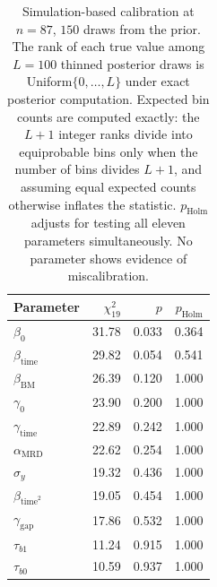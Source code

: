\begin{table}[!htbp]
\centering
\caption{Simulation-based calibration at $n=87$, $150$ draws from the prior. The rank of each true value among $L=100$ thinned posterior draws is Uniform$\{0,\dots,L\}$ under exact posterior computation. Expected bin counts are computed exactly: the $L+1$ integer ranks divide into equiprobable bins only when the number of bins divides $L+1$, and assuming equal expected counts otherwise inflates the statistic. $p_{\mathrm{Holm}}$ adjusts for testing all eleven parameters simultaneously. No parameter shows evidence of miscalibration.}
\label{tab:sbc}
\small
\begin{tabular}{lrrr}
\toprule
Parameter & $\chi^2_{19}$ & $p$ & $p_{\mathrm{Holm}}$\\
\midrule
$\beta_0$ & 31.78 & 0.033 & 0.364\\
$\beta_{\mathrm{time}}$ & 29.82 & 0.054 & 0.541\\
$\beta_{\mathrm{BM}}$ & 26.39 & 0.120 & 1.000\\
$\gamma_0$ & 23.90 & 0.200 & 1.000\\
$\gamma_{\mathrm{time}}$ & 22.89 & 0.242 & 1.000\\
$\alpha_{\mathrm{MRD}}$ & 22.62 & 0.254 & 1.000\\
$\sigma_y$ & 19.32 & 0.436 & 1.000\\
$\beta_{\mathrm{time}^2}$ & 19.05 & 0.454 & 1.000\\
$\gamma_{\mathrm{gap}}$ & 17.86 & 0.532 & 1.000\\
$\tau_{b1}$ & 11.24 & 0.915 & 1.000\\
$\tau_{b0}$ & 10.59 & 0.937 & 1.000\\
\bottomrule
\end{tabular}
\end{table}
